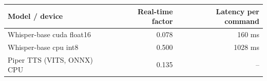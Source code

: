 \begin{tabular}{lrr}
\toprule
Model / device & Real-time factor & Latency per command \\
\midrule
Whisper-base cuda float16 & 0.078 & 160 ms \\
Whisper-base cpu int8 & 0.500 & 1028 ms \\
Piper TTS (VITS, ONNX) CPU & 0.135 & -- \\
\bottomrule
\end{tabular}
